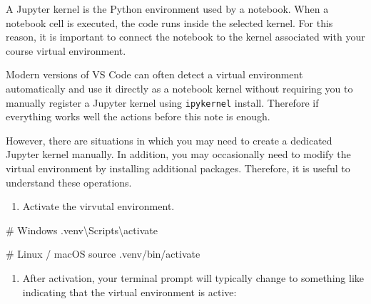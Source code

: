 \documentclass[
  letterpaper,
  DIV=11,
  numbers=noendperiod]{scrreprt}
\newenvironment{Shaded}{\begin{snugshade}}{\end{snugshade}}
\newcommand{\BuiltInTok}[1]{\textcolor[rgb]{0.00,0.23,0.31}{#1}}
\newcommand{\CommentTok}[1]{\textcolor[rgb]{0.37,0.37,0.37}{#1}}
\newcommand{\ExtensionTok}[1]{\textcolor[rgb]{0.00,0.23,0.31}{#1}}
\newcommand{\NormalTok}[1]{\textcolor[rgb]{0.00,0.23,0.31}{#1}}
\providecommand{\tightlist}{%
  \setlength{\itemsep}{0pt}\setlength{\parskip}{0pt}}
\theoremstyle{definition}
\theoremstyle{definition}
\theoremstyle{plain}
\theoremstyle{plain}
\theoremstyle{remark}
\begin{document}
\begin{tcolorbox}[enhanced jigsaw, arc=.35mm, bottomrule=.15mm, bottomtitle=1mm, breakable, colback=white, colbacktitle=quarto-callout-note-color!10!white, colframe=quarto-callout-note-color-frame, coltitle=black, left=2mm, leftrule=.75mm, opacityback=0, opacitybacktitle=0.6, rightrule=.15mm, title=\textcolor{quarto-callout-note-color}{\faInfo}\hspace{0.5em}{Jupyter kernels and modifying venv}, titlerule=0mm, toprule=.15mm, toptitle=1mm]

A Jupyter kernel is the Python environment used by a notebook. When a
notebook cell is executed, the code runs inside the selected kernel. For
this reason, it is important to connect the notebook to the kernel
associated with your course virtual environment.

Modern versions of VS Code can often detect a virtual environment
automatically and use it directly as a notebook kernel without requiring
you to manually register a Jupyter kernel using \texttt{ipykernel}
install. Therefore if everything works well the actions before this note
is enough.

However, there are situations in which you may need to create a
dedicated Jupyter kernel manually. In addition, you may occasionally
need to modify the virtual environment by installing additional
packages. Therefore, it is useful to understand these operations.

\begin{enumerate}
\def\labelenumi{\arabic{enumi}.}
\tightlist
\item
  Activate the virvutal environment.
\end{enumerate}

\begin{Shaded}
\begin{Highlighting}[]
\CommentTok{\# Windows}
\ExtensionTok{.venv\textbackslash{}Scripts\textbackslash{}activate}

\CommentTok{\# Linux / macOS}
\BuiltInTok{source}\NormalTok{ .venv/bin/activate}
\end{Highlighting}
\end{Shaded}

\begin{enumerate}
\def\labelenumi{\arabic{enumi}.}
\setcounter{enumi}{1}
\tightlist
\item
  After activation, your terminal prompt will typically change to
  something like indicating that the virtual environment is active:
\end{enumerate}


\end{tcolorbox}
\end{document}
